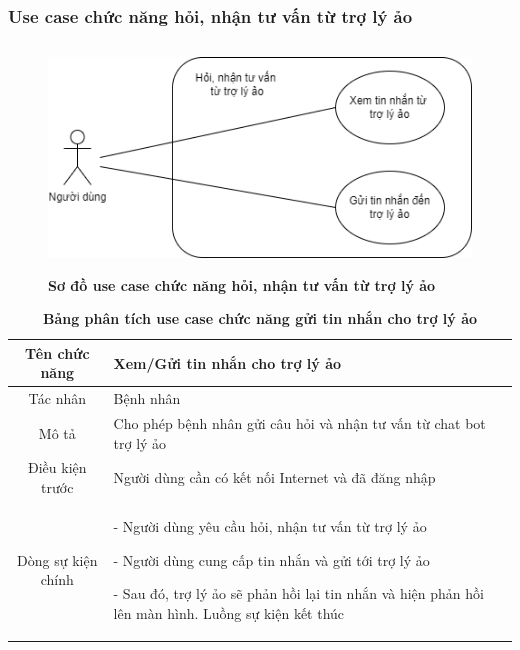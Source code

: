 \subsubsection{Use case chức năng hỏi, nhận tư vấn từ trợ lý ảo}
  \begin{figure}[H]
    \centering
    \includegraphics[width=12cm,height=6cm]{Images/use_case/use_case_chatbot.png}
    \caption[Sơ đồ use case chức năng hỏi, nhận tư vấn từ trợ lý ảo]{\bfseries \fontsize{12pt}{0pt}
    \selectfont Sơ đồ use case chức năng hỏi, nhận tư vấn từ trợ lý ảo}
    \label{use_case_chat_ai} %
  \end{figure}
  \begin{table}[H]
    \caption{\bfseries \fontsize{12pt}{0pt}\selectfont Bảng phân tích use case chức năng gửi tin nhắn cho trợ lý ảo}
    \centering
    \begin{tabularx}{0.9\textwidth}{|c|X|}
      \hline
      \textbf{Tên chức năng} & \textbf{Xem/Gửi tin nhắn cho trợ lý ảo} \\
      \hline
      Tác nhân & Bệnh nhân \\
      \hline
      Mô tả & Cho phép bệnh nhân gửi câu hỏi và nhận tư vấn từ chat bot trợ lý ảo \\
      \hline
      Điều kiện trước & Người dùng cần có kết nối Internet và đã đăng nhập \\
      \hline
      Dòng sự kiện chính & 
        - Người dùng yêu cầu hỏi, nhận tư vấn từ trợ lý ảo
        
        - Người dùng cung cấp tin nhắn và gửi tới trợ lý ảo 

        - Sau đó, trợ lý ảo sẽ phản hồi lại tin nhắn và hiện phản hồi lên màn hình. Luồng sự kiện kết thúc
        \\
      \hline
    \end{tabularx}
  \end{table}  

